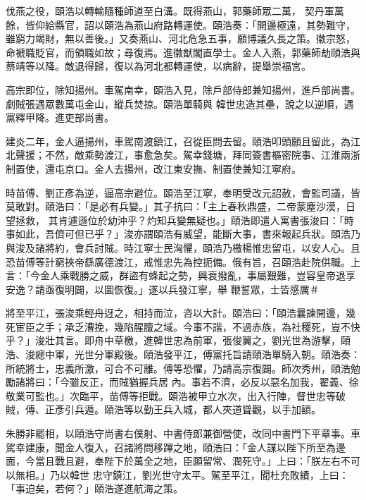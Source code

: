 \begin{pinyinscope}
 伐燕之役，頤浩以轉輸隨種師道至白溝。既得燕山，郭藥師眾二萬，
 契丹軍萬餘，皆仰給縣官，詔以頤浩為燕山府路轉運使。頤浩奏：「開邊極遠，其勢難守，雖窮力竭財，無以善後。」又奏燕山、河北危急五事，願博議久長之策。徽宗怒，命褫職貶官，而領職如故；尋復焉。進徽猷閣直學士。金人入燕，郭藥師劫頤浩與蔡靖等以降。敵退得歸，復以為河北都轉運使，以病辭，提舉崇福宮。



 高宗即位，除知揚州。車駕南幸，頤浩入見，除戶部侍郎兼知揚州，進戶部尚書。劇賊張遇眾數萬屯金山，縱兵焚掠。頤浩單騎與
 韓世忠造其壘，說之以逆順，遇黨釋甲降。進吏部尚書。



 建炎二年，金人逼揚州，車駕南渡鎮江，召從臣問去留。頤浩叩頭願且留此，為江北聲援；不然，敵乘勢渡江，事愈急矣。駕幸錢塘，拜同簽書樞密院事、江淮兩浙制置使，還屯京口。金人去揚州，改江東安撫、制置使兼知江寧府。



 時苗傅、劉正彥為逆，逼高宗避位。頤浩至江寧，奉明受改元詔赦，會監司議，皆莫敢對。頤浩曰：「是必有兵變。」其子抗曰：「主上春秋鼎盛，二帝蒙塵沙漠，日望拯救，
 其肯遽遜位於幼沖乎？灼知兵變無疑也。」頤浩即遣人寓書張浚曰：「時事如此，吾儕可但已乎？」浚亦謂頤浩有威望，能斷大事，書來報起兵狀。頤浩乃與浚及諸將約，會兵討賊。時江寧士民洶懼，頤浩乃檄楊惟忠留屯，以安人心。且恐苗傅等計窮挾帝繇廣德渡江，戒惟忠先為控扼備。俄有旨，召頤浩赴院供職。上言：「今金人乘戰勝之威，群盜有蜂起之勢，興衰撥亂，事屬艱難，豈容皇帝退享安逸？請亟復明闢，以圖恢復。」遂以兵發江寧，舉
 鞭誓眾，士皆感厲＃



 將至平江，張浚乘輕舟迓之，相持而泣，咨以大計。頤浩曰：「頤浩曩諫開邊，幾死宦臣之手；承乏漕挽，幾陷腥膻之域。今事不諧，不過赤族，為社稷死，豈不快乎？」浚壯其言。即舟中草檄，進韓世忠為前軍，張俊翼之，劉光世為游擊，頤浩、浚總中軍，光世分軍殿後。頤浩發平江，傅黨托旨請頤浩單騎入朝。頤浩奏：所統將士，忠義所激，可合不可離。傅等恐懼，乃請高宗復闢。師次秀州，頤浩勉勵諸將曰：「今雖反正，而賊猶握兵居
 內。事若不濟，必反以惡名加我，翟義、徐敬業可監也。」次臨平，苗傅等拒戰。頤浩被甲立水次，出入行陣，督世忠等破賊，傅、正彥引兵遁。頤浩等以勤王兵入城，都人夾道聳觀，以手加額。



 朱勝非罷相，以頤浩守尚書右僕射、中書侍郎兼御營使，改同中書門下平章事。車駕幸建康，聞金人復入，召諸將問移蹕之地，頤浩曰：「金人謀以陛下所至為邊面，今當且戰且避，奉陛下於萬全之地，臣願留常、潤死守。」上曰：「朕左右不可以無相。」乃以韓世
 忠守鎮江，劉光世守太平。駕至平江，聞杜充敗績，上曰：「事迫矣，若何？」頤浩遂進航海之策。




\end{pinyinscope}
